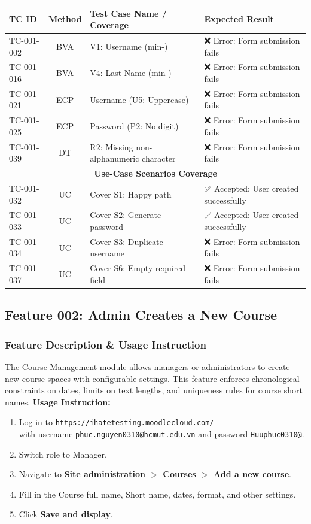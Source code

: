 \documentclass[twoside,final]{hcmut-report}
\begin{document}
\begin{table}[H]
\centering
\renewcommand{\arraystretch}{1.2}
\begin{tabularx}{\textwidth}{|l|c|X|X|}
\hline
\textbf{TC ID} & \textbf{Method} & \textbf{Test Case Name / Coverage} & \textbf{Expected Result} \\ \hline
TC-001-002 & BVA & V1: Username (min-) & ❌ Error: Form submission fails \\ \hline
TC-001-016 & BVA & V4: Last Name (min-) & ❌ Error: Form submission fails \\ \hline
TC-001-021 & ECP & Username (U5: Uppercase) & ❌ Error: Form submission fails \\ \hline
TC-001-025 & ECP & Password (P2: No digit) & ❌ Error: Form submission fails \\ \hline
TC-001-039 & DT  & R2: Missing non-alphanumeric character & ❌ Error: Form submission fails \\ \hline
\multicolumn{4}{|c|}{\cellcolor{gray!20}\textbf{Use-Case Scenarios Coverage}} \\ \hline
TC-001-032 & UC & Cover S1: Happy path & ✅ Accepted: User created successfully \\ \hline
TC-001-033 & UC & Cover S2: Generate password & ✅ Accepted: User created successfully \\ \hline
TC-001-034 & UC & Cover S3: Duplicate username & ❌ Error: Form submission fails \\ \hline
TC-001-037 & UC & Cover S6: Empty required field & ❌ Error: Form submission fails \\ \hline
\end{tabularx}
\end{table}

\subsection{Feature 002: Admin Creates a New Course}

\subsubsection{Feature Description \& Usage Instruction}
The Course Management module allows managers or administrators to create new course spaces with configurable settings. This feature enforces chronological constraints on dates, limits on text lengths, and uniqueness rules for course short names.
\newline
\textbf{Usage Instruction:}
\begin{enumerate}
    \item Log in to \texttt{https://ihatetesting.moodlecloud.com/}\\ with username \texttt{phuc.nguyen0310@hcmut.edu.vn} and password \texttt{Huuphuc0310@}.
    \item Switch role to Manager.
    \item Navigate to \textbf{Site administration $>$ Courses $>$ Add a new course}.
    \item Fill in the Course full name, Short name, dates, format, and other settings.
    \item Click \textbf{Save and display}.
\end{enumerate}
\end{document}
